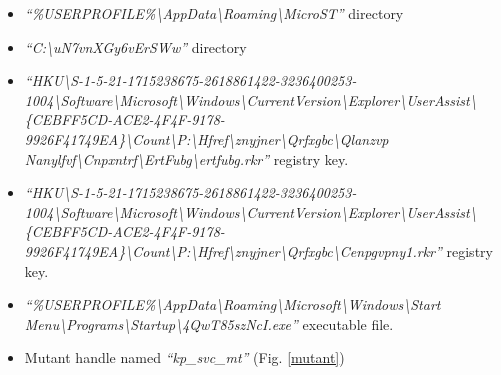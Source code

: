 \documentclass[10pt,a4paper]{article}
\begin{document}
				\begin{itemize}
					\item \textit{``\%USERPROFILE\%\textbackslash AppData\textbackslash Roaming\textbackslash MicroST''} directory
					\item \textit{``C:\textbackslash uN7vnXGy6vErSWw''} directory
					\item \textit{``HKU\textbackslash S-1-5-21-1715238675-2618861422-3236400253-1004\textbackslash Software\textbackslash Microsoft\textbackslash Windows\textbackslash CurrentVersion\textbackslash Explorer\textbackslash UserAssist\textbackslash\{CEBFF5CD-ACE2-4F4F-9178-9926F41749EA\}\textbackslash Count\textbackslash P:\textbackslash Hfref\textbackslash znyjner\textbackslash Qrfxgbc\textbackslash Qlanzvp Nanylfvf\textbackslash Cnpxntrf\textbackslash ErtFubg\textbackslash ertfubg.rkr''} registry key.
					\item \textit{``HKU\textbackslash S-1-5-21-1715238675-2618861422-3236400253-1004\textbackslash Software\textbackslash Microsoft\textbackslash Windows\textbackslash CurrentVersion\textbackslash Explorer\textbackslash UserAssist\textbackslash\{CEBFF5CD-ACE2-4F4F-9178-9926F41749EA\}\textbackslash Count\textbackslash P:\textbackslash Hfref\textbackslash znyjner\textbackslash Qrfxgbc\textbackslash Cenpgvpny1.rkr''} registry key.
					\item \textit{``\%USERPROFILE\%\textbackslash AppData\textbackslash Roaming\textbackslash Microsoft\textbackslash Windows\textbackslash Start Menu\textbackslash Programs\textbackslash Startup\textbackslash 4QwT85szNcI.exe''} executable file.
					\item Mutant handle named \textit{``kp\_svc\_mt''} (Fig. \ref{mutant})
				\end{itemize}

\newpage
\end{document}
